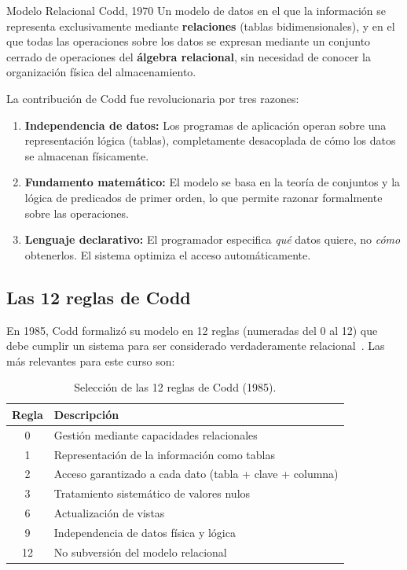 \documentclass[12pt, a4paper]{article}
\begin{document}
	\begin{definicion}{Modelo Relacional Codd, 1970}
		Un modelo de datos en el que la información se representa
		exclusivamente mediante \textbf{relaciones} (tablas bidimensionales),
		y en el que todas las operaciones sobre los datos se expresan
		mediante un conjunto cerrado de operaciones del
		\textbf{álgebra relacional}, sin necesidad de conocer la
		organización física del almacenamiento.
	\end{definicion}
	
	La contribución de Codd fue revolucionaria por tres razones:
	
	\begin{enumerate}
		\item \textbf{Independencia de datos:} Los programas de aplicación
		operan sobre una representación lógica (tablas), completamente
		desacoplada de cómo los datos se almacenan físicamente.
		
		\item \textbf{Fundamento matemático:} El modelo se basa en la
		teoría de conjuntos y la lógica de predicados de primer orden,
		lo que permite razonar formalmente sobre las operaciones.
		
		\item \textbf{Lenguaje declarativo:} El programador especifica
		\emph{qué} datos quiere, no \emph{cómo} obtenerlos.
		El sistema optimiza el acceso automáticamente.
	\end{enumerate}
	
	\subsection{Las 12 reglas de Codd}
	
	En 1985, Codd formalizó su modelo en 12 reglas
	(numeradas del 0 al 12) que debe cumplir un sistema para
	ser considerado verdaderamente relacional~\cite{codd1985}.
	Las más relevantes para este curso son:
	
	\begin{table}[H]
		\centering
		\small
		\renewcommand{\arraystretch}{1.3}
		\begin{tabularx}{\columnwidth}{@{} c X @{}}
			\toprule
			\textbf{Regla} & \textbf{Descripción} \\
			\midrule
			0 & Gestión mediante capacidades relacionales \\
			1 & Representación de la información como tablas \\
			2 & Acceso garantizado a cada dato (tabla + clave + columna) \\
			3 & Tratamiento sistemático de valores nulos \\
			6 & Actualización de vistas \\
			9 & Independencia de datos física y lógica \\
			12 & No subversión del modelo relacional \\
			\bottomrule
		\end{tabularx}
		\caption{Selección de las 12 reglas de Codd (1985).}
		\label{tab:reglas-codd}
	\end{table}
	
\end{document}
